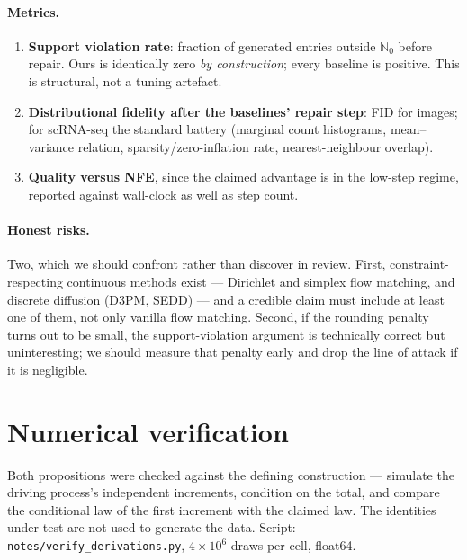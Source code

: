 \documentclass[11pt,a4paper]{article}
\def\N{\mathbb{N}}
\begin{document}
\paragraph{Metrics.}
\begin{enumerate}
\item \textbf{Support violation rate}: fraction of generated entries outside
$\N_0$ before repair. Ours is identically zero \emph{by construction}; every baseline
is positive. This is structural, not a tuning artefact.
\item \textbf{Distributional fidelity after the baselines' repair step}: FID for
images; for scRNA-seq the standard battery (marginal count histograms, mean--variance
relation, sparsity/zero-inflation rate, nearest-neighbour overlap).
\item \textbf{Quality versus NFE}, since the claimed advantage is in the low-step
regime, reported against wall-clock as well as step count.
\end{enumerate}

\paragraph{Honest risks.} Two, which we should confront rather than discover in
review. First, constraint-respecting continuous methods exist --- Dirichlet and
simplex flow matching, and discrete diffusion (D3PM, SEDD) --- and a credible claim
must include at least one of them, not only vanilla flow matching. Second, if the
rounding penalty turns out to be small, the support-violation argument is
technically correct but uninteresting; we should measure that penalty early and drop
the line of attack if it is negligible.

\section{Numerical verification}

Both propositions were checked against the defining construction --- simulate the
driving process's independent increments, condition on the total, and compare the
conditional law of the first increment with the claimed law. The identities under
test are not used to generate the data. Script: \texttt{notes/verify\_derivations.py},
$4\times10^6$ draws per cell, float64.
\end{document}
